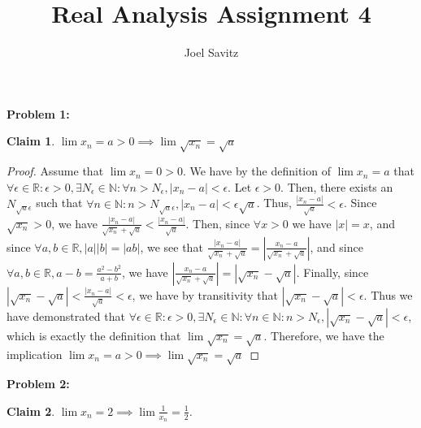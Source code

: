 \documentclass{article}
\title{Real Analysis Assignment 4}
\author{Joel Savitz}
\newcommand{\reals}{\ensuremath{\mathbb{R}}}
\newcommand{\nats}{\ensuremath{\mathbb{N}}}
\newcommand{\eps}{\ensuremath{\epsilon}}
\newtheorem{clm}{Claim}
\begin{document}
\maketitle

\textbf{Problem 1:}

\begin{clm}
	$\lim x_n = a > 0 \implies \lim \sqrt{x_n} = \sqrt{a}$
\end{clm}

\begin{proof}
	Assume that $\lim x_n = 0 > 0$.
	We have by the definition of $\lim x_n = a$
	that $\forall \eps \in \reals : \eps > 0, \exists N_\eps \in \nats: \forall n > N_\eps, | x_n - a | < \eps$.
	Let $\eps > 0$.
	Then, there exists an $N_{\sqrt{a}\eps}$
	such that $\forall n \in \nats : n > N_{\sqrt{a}\eps}, | x_n - a | < \eps \sqrt{a}$.
	Thus, $\frac{|x_n - a|}{\sqrt{a}} < \eps$.
	Since $\sqrt{x_n} > 0$, we have 
	$\frac{|x_n - a|}{\sqrt{x_n} + \sqrt{a}} < \frac{|x_n - a|}{\sqrt{a}}$.
	Then, since $\forall x > 0$ we have $|x| = x$,
	and since $\forall a,b \in \reals, |a||b| = |ab|$,
	we see that 
	$\frac{|x_n - a|}{\sqrt{x_n} + \sqrt{a}} = |\frac{x_n - a}{\sqrt{x_n} + \sqrt{a}}|$,
	and since $\forall a, b \in \reals, a - b = \frac{a^2 - b^2}{a + b}$,
	we have $|\frac{x_n - a}{\sqrt{x_n} + \sqrt{a}}| = | \sqrt{x_n} - \sqrt{a} |$.
	Finally, since $| \sqrt{x_n} - \sqrt{a} | < \frac{|x_n - a|}{\sqrt{a}}	< \eps$,
	we have by transitivity that $| \sqrt{x_n} - \sqrt{a} | < \eps$.
	Thus we have demonstrated that
	$\forall \eps \in \reals: \eps > 0, \exists N_\eps \in \nats: \forall n \in \nats: n > N_\eps,
	| \sqrt{x_n} - \sqrt{a} | < \eps$,
	which is exactly the definition that $\lim \sqrt{x_n} = \sqrt{a}$.
	Therefore, we have the implication $\lim x_n = a > 0 \implies \lim \sqrt{x_n} = \sqrt{a}$
\end{proof}

\textbf{Problem 2:}

\begin{clm}
	$\lim x_n = 2 \implies \lim \frac{1}{x_n} = \frac{1}{2}$.
\end{clm}
\end{document}
